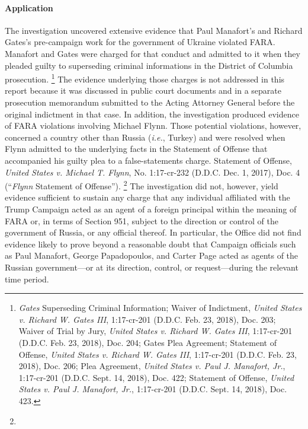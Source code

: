 \paragraph{Application}
The investigation uncovered extensive evidence that Paul Manafort's and Richard Gates's pre-campaign work for the government of Ukraine violated FARA.
Manafort and Gates were charged for that conduct and admitted to it when they pleaded guilty to superseding criminal informations in the District of Columbia prosecution.%
\footnote{\textit{Gates} Superseding Criminal Information;
Waiver of Indictment, \textit{United States v. Richard W. Gates III}, 1:17-cr-201 (D.D.C. Feb. 23, 2018), Doc. 203;
Waiver of Trial by Jury, \textit{United States v. Richard W. Gates III}, 1:17-cr-201 (D.D.C. Feb. 23, 2018), Doc. 204;
Gates Plea Agreement;
Statement of Offense, \textit{United States v. Richard W. Gates III}, 1:17-cr-201 (D.D.C. Feb. 23, 2018), Doc. 206;
Plea Agreement, \textit{United States v. Paul J. Manafort, Jr.}, 1:17-cr-201 (D.D.C. Sept. 14, 2018), Doc. 422;
Statement of Offense, \textit{United States v. Paul J. Manafort, Jr.}, 1:17-cr-201 (D.D.C. Sept. 14, 2018), Doc. 423.}
The evidence underlying those charges is not addressed in this report because it was discussed in public court documents and in a separate prosecution memorandum submitted to the Acting Attorney General before the original indictment in that case.
In addition, the investigation produced evidence of FARA violations involving Michael Flynn.
Those potential violations, however, concerned a country other than Russia (\textit{i.e.}, Turkey) and were resolved when Flynn admitted to the underlying facts in the Statement of Offense that accompanied his guilty plea to a false-statements charge.
Statement of Offense, \textit{United States v. Michael T. Flynn}, No. 1:17-cr-232 (D.D.C. Dec. 1, 2017), Doc. 4 (``\textit{Flynn} Statement of Offense'').%
\footnote{}
The investigation did not, however, yield evidence sufficient to sustain any charge that any individual affiliated with the Trump Campaign acted as an agent of a foreign principal within the meaning of FARA or, in terms of Section 951, subject to the direction or control of the government of Russia, or any official thereof.
In particular, the Office did not find evidence likely to prove beyond a reasonable doubt that Campaign officials such as Paul Manafort, George Papadopoulos, and Carter Page acted as agents of the Russian government---or at its direction, control, or request---during the relevant time period.%
